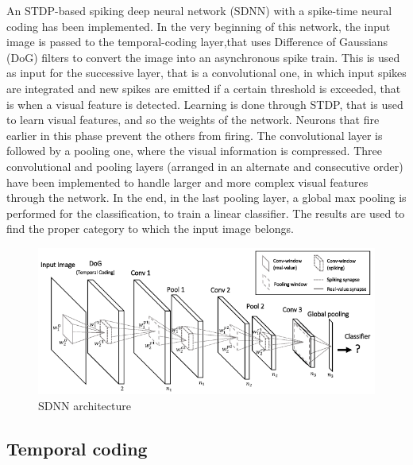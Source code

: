 \documentclass[11pt,a4paper]{scrartcl}
\begin{document}
An STDP-based spiking deep neural network (SDNN) with a spike-time neural coding has been implemented. In the very beginning of this network, the input image is passed to the temporal-coding layer,that uses Difference of Gaussians (DoG) filters to convert the image into an asynchronous spike train. This is used as input for the successive layer, that is a convolutional one,
in which input spikes are integrated and new spikes are emitted if a certain threshold is exceeded, that is when a visual feature is detected. Learning is done through STDP, that is used to learn visual features, and so the weights of the network. Neurons that fire earlier in this phase prevent the others from firing. The convolutional layer is followed by a pooling one, where the visual information is compressed. Three convolutional and pooling layers (arranged in an alternate and consecutive order) have been implemented to handle larger and more complex visual features through the network. In the end, in the last pooling layer, a global max pooling is performed for the classification, to train a linear classifier. The results are used to find the proper category to which the input image belongs.\\
\begin{figure}[h]
	\centering
	\includegraphics[width=\textwidth]{images/architecture}
	\caption{SDNN architecture}
	\label{fig:architecture}
\end{figure}

\subsection{Temporal coding}
\end{document}
